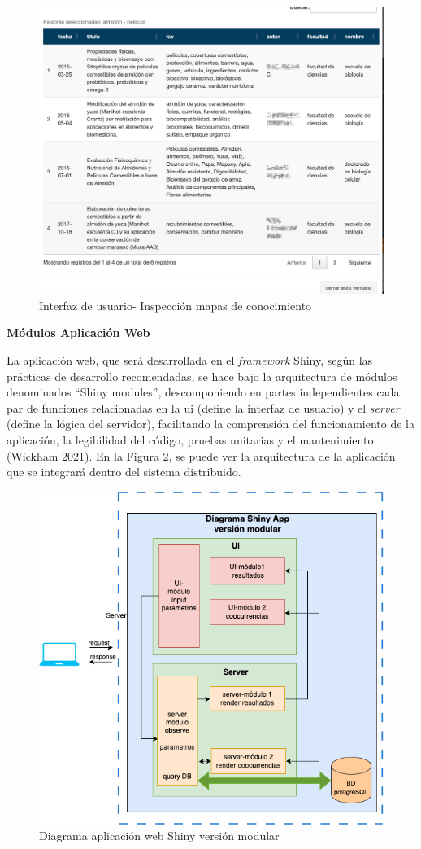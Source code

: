 \documentclass[
  12pt,
  openany]{book}
\begin{document}
\begin{enumerate}
  \begin{figure}

  {\centering \includegraphics[width=0.6\linewidth]{images/05-desarrollo/4_ciclo/UI/uiinspeccionmapas} 

  }

  \caption{Interfaz de usuario- Inspección mapas de conocimiento }\label{fig:detallemc}
  \end{figure}

  \newpage
\end{enumerate}

\textbf{Módulos Aplicación Web}

La aplicación web, que será desarrollada en el \emph{framework} Shiny, según las prácticas de desarrollo recomendadas, se hace bajo la arquitectura de módulos denominados ``Shiny modules'', descomponiendo en partes independientes cada par de funciones relacionadas en la ui (define la interfaz de usuario) y el \emph{server} (define la lógica del servidor), facilitando la comprensión del funcionamiento de la aplicación, la legibilidad del código, pruebas unitarias y el mantenimiento (\protect\hyperlink{ref-wickham2021}{Wickham 2021}). En la Figura \ref{fig:shinymodulo}, se puede ver la arquitectura de la aplicación que se integrará dentro del sistema distribuido.

\begin{figure}

{\centering \includegraphics[width=0.6\linewidth]{images/05-desarrollo/4_ciclo/digrama_shinyapp_modulos} 

}

\caption{Diagrama aplicación web Shiny versión modular}\label{fig:shinymodulo}
\end{figure}
\end{document}
